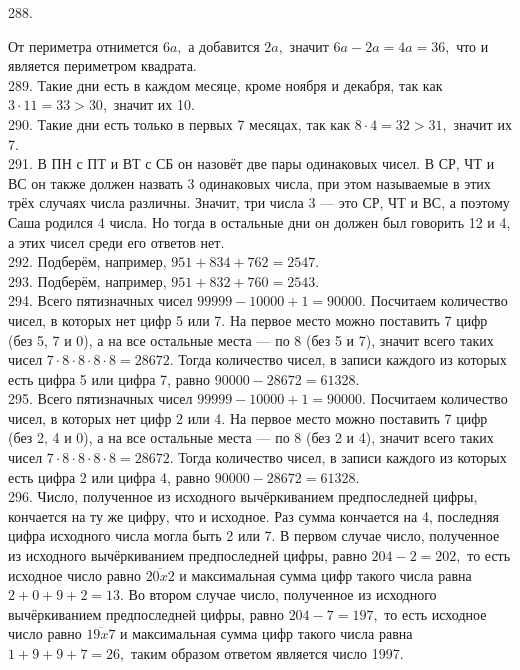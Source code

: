 288. \begin{center}
\begin{figure}[ht!]
\end{figure}
\end{center}
От периметра отнимется $6a,$ а добавится $2a,$ значит $6a-2a=4a=36,$ что и является периметром квадрата.\\
289. Такие дни есть в каждом месяце, кроме ноября и декабря, так как $3\cdot11=33>30,$ значит их 10.\\
290. Такие дни есть только в первых 7 месяцах, так как $8\cdot4=32>31,$ значит их 7.\\
291. В ПН с ПТ и ВТ с СБ он назовёт две пары одинаковых чисел. В СР, ЧТ и ВС он также должен назвать 3 одинаковых числа, при этом называемые в этих трёх случаях числа различны. Значит, три числа 3 --- это СР, ЧТ и ВС, а поэтому Саша родился 4 числа. Но тогда в остальные дни он должен был говорить 12 и 4, а этих чисел среди его ответов нет.\\
292. Подберём, например, $951+834+762=2547.$\\
293. Подберём, например, $951+832+760=2543.$\\
294. Всего пятизначных чисел $99999-10000+1=90000.$ Посчитаем количество чисел, в которых нет цифр 5 или 7. На первое место можно поставить 7 цифр (без 5, 7 и 0), а на все остальные места --- по 8 (без 5 и 7), значит всего таких чисел $7\cdot8\cdot8\cdot8\cdot8=28672.$ Тогда количество чисел, в записи каждого из которых есть цифра 5 или цифра 7, равно $90000-28672=61328.$\\
295. Всего пятизначных чисел $99999-10000+1=90000.$ Посчитаем количество чисел, в которых нет цифр 2 или 4. На первое место можно поставить 7 цифр (без 2, 4 и 0), а на все остальные места --- по 8 (без 2 и 4), значит всего таких чисел $7\cdot8\cdot8\cdot8\cdot8=28672.$ Тогда количество чисел, в записи каждого из которых есть цифра 2 или цифра 4, равно $90000-28672=61328.$\\
296. Число, полученное из исходного вычёркиванием предпоследней цифры, кончается на ту же цифру, что и исходное. Раз сумма кончается на 4, последняя цифра исходного числа могла быть 2 или 7. В первом случае число, полученное из исходного вычёркиванием предпоследней цифры, равно $204-2=202,$ то есть исходное число равно $\overline{20x2}$ и максимальная сумма цифр такого числа равна $2+0+9+2=13.$ Во втором случае число, полученное из исходного вычёркиванием предпоследней цифры, равно $204-7=197,$ то есть исходное число равно $\overline{19x7}$ и максимальная сумма цифр такого числа равна $1+9+9+7=26,$ таким образом ответом является число 1997.\\
